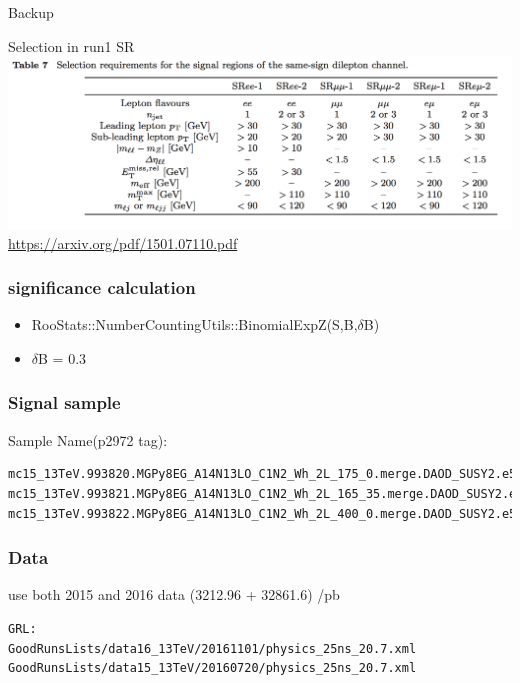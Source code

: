 \documentclass[mathserif,serif]{beamer}
\begin{document}
\begin{frame}
\begin{center}
\huge
Backup
\end{center}
\end{frame}

\begin{frame}{Selection in run1 SR}
\includegraphics[width=\textwidth]{data/photo/SRcutrun1.png} \\
\url{https://arxiv.org/pdf/1501.07110.pdf}
\end{frame}

\begin{frame}
\frametitle{significance calculation}
\begin{itemize}
\item RooStats::NumberCountingUtils::BinomialExpZ(S,B,$\delta$B)
\item $\delta$B = 0.3
\end{itemize}
\end{frame}



\begin{frame}[fragile]
\frametitle{Signal sample}
\small
Sample Name(p2972 tag):
\tiny
\begin{verbatim}
mc15_13TeV.993820.MGPy8EG_A14N13LO_C1N2_Wh_2L_175_0.merge.DAOD_SUSY2.e5678_a766_a821_r7676_p2949_p2972
mc15_13TeV.993821.MGPy8EG_A14N13LO_C1N2_Wh_2L_165_35.merge.DAOD_SUSY2.e5678_a766_a821_r7676_p2949_p2972
mc15_13TeV.993822.MGPy8EG_A14N13LO_C1N2_Wh_2L_400_0.merge.DAOD_SUSY2.e5678_a766_a821_r7676_p2949_p2972
\end{verbatim}
\end{frame}

\begin{frame}[fragile]
\frametitle{Data}
\small
use both 2015 and 2016 data (3212.96 + 32861.6) /pb
\tiny
\begin{verbatim}
GRL:
GoodRunsLists/data16_13TeV/20161101/physics_25ns_20.7.xml
GoodRunsLists/data15_13TeV/20160720/physics_25ns_20.7.xml
\end{verbatim}
\end{frame}
\end{document}
